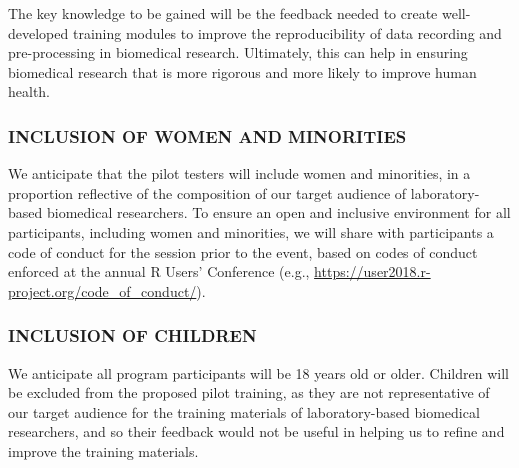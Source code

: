 \documentclass[pdftex,english,11.5pt,parskip=half]{scrartcl}
\begin{document}
The 
key knowledge to be gained will be the feedback needed to create well-developed training modules to improve the 
reproducibility of data recording and pre-processing in biomedical research. 
Ultimately, this can help in ensuring biomedical research that is more 
rigorous and more likely to improve human health.

\subsubsection*{INCLUSION OF WOMEN AND MINORITIES}

We anticipate that the pilot testers will include women and minorities, in a 
proportion reflective of the composition of our target audience of laboratory-based
biomedical researchers. To ensure an open and inclusive environment for all 
participants, including women and minorities, we will share with participants a 
code of conduct for the session prior to the event, based on codes of conduct 
enforced at the annual R Users' Conference (e.g., \url{https://user2018.r-project.org/code_of_conduct/}).

\subsubsection*{INCLUSION OF CHILDREN}

We anticipate all program participants will be 18 years old or older. Children will be excluded from the proposed pilot training, as they are not representative of our target audience for the training materials of laboratory-based biomedical researchers, and so their feedback would not be useful in helping us to refine and 
improve the training materials. 
\end{document}
